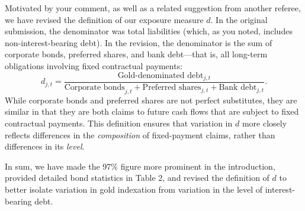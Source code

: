 Motivated by your comment, as well as a related suggestion from another referee, we have revised the definition of our exposure measure $d$. In the original submission, the denominator was total liabilities (which, as you noted, includes non-interest-bearing debt). In the revision, the denominator is the sum of corporate bonds, preferred shares, and bank debt---that is, all long-term obligations involving fixed contractual payments:
\[
d_{j,t} = \frac{\text{Gold-denominated debt}_{j,t}}{\text{Corporate bonds}_{j,t} + \text{Preferred shares}_{j,t} + \text{Bank debt}_{j,t}}.
\]
While corporate bonds and preferred shares are not perfect substitutes, they are similar in that they are both claims to future cash flows that are subject to fixed contractual payments. This definition ensures that variation in $d$ more closely reflects differences in the \textit{composition} of fixed-payment claims, rather than differences in its \textit{level}.

In sum, we have made the 97\% figure more prominent in the introduction, provided detailed bond statistics in Table 2, and revised the definition of $d$ to better isolate variation in gold indexation from variation in the level of interest-bearing debt.